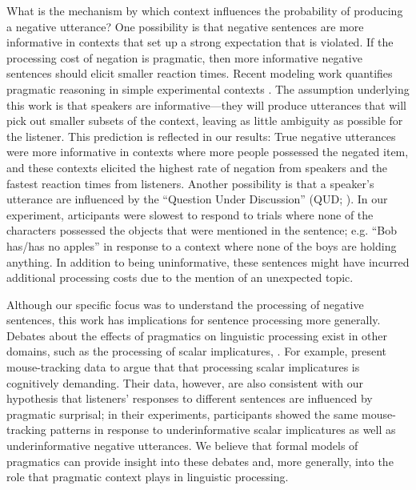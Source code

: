 \documentclass[man]{apa2}
\begin{document}
What is the mechanism by which context influences the probability of producing a negative utterance?  One possibility is that negative sentences are more informative in contexts that set up a strong expectation that is violated. If the processing cost of negation is pragmatic, then more informative negative sentences should elicit smaller reaction times.  Recent modeling work quantifies pragmatic reasoning in simple experimental contexts \cite{frank2012,goodman2013}. The assumption underlying this work is that speakers are informative---they will produce utterances that will pick out smaller subsets of the context, leaving as little ambiguity as possible for the listener.  This prediction is reflected in our results: True negative utterances were more informative in contexts where more people possessed the negated item, and these contexts elicited the highest rate of negation from speakers and the fastest reaction times from listeners. Another possibility is that a speaker's utterance are influenced by the ``Question Under Discussion'' (QUD; ). In our experiment, articipants were slowest to respond to trials where none of the characters possessed the objects that were mentioned in the sentence; e.g. ``Bob has/has no apples'' in response to a context where none of the boys are holding anything.  In addition to being uninformative, these sentences might have incurred additional processing costs due to the mention of an unexpected topic.  



Although our specific focus was to understand the processing of negative sentences, this work has implications for sentence processing more generally.  Debates about the effects of pragmatics on linguistic processing exist in other domains, such as the processing of scalar implicatures, .  For example,  present mouse-tracking data to argue that that processing scalar implicatures is cognitively demanding. Their data, however, are also consistent with our hypothesis that listeners' responses to different sentences are influenced by pragmatic surprisal; in their experiments, participants showed the same mouse-tracking patterns in response to underinformative scalar implicatures as well as underinformative negative utterances.  We believe that formal models of pragmatics can provide insight into these debates and, more generally, into the role that pragmatic context plays in linguistic processing. 
 




\setlength{\bibleftmargin}{.125in}
\setlength{\bibindent}{-\bibleftmargin}


\end{document}
